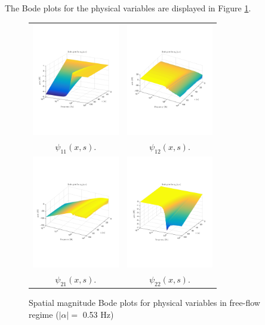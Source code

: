 \documentclass[a4paper, 10pt, conference]{ieeeconf}      %
\begin{document}
The Bode plots for the physical variables are displayed in Figure \ref{fig:Magn_spatial_physx}.

\begin{figure}
\centering
\begin{tabular}{cc}
\includegraphics[trim = 0mm 60mm 0mm 60mm, width = 3.8cm]{distr_psi_11}
&
\includegraphics[trim = 0mm 60mm 0mm 60mm, width = 3.8cm]{distr_psi_12}
\tabularnewline
$\psi_{11}(x,s)$.
&
$\psi_{12}(x,s)$.
\tabularnewline
\includegraphics[trim = 0mm 60mm 0mm 60mm, width = 3.8cm]{distr_psi_21}
&
\includegraphics[trim = 0mm 60mm 0mm 60mm, width = 3.8cm]{distr_psi_22}
\tabularnewline
$\psi_{21}(x,s)$.
&
$\psi_{22}(x,s)$.
\end{tabular}
\caption{Spatial magnitude Bode plots for physical variables in free-flow regime ($\left|\alpha\right| = $ 0.53 Hz)\label{fig:Magn_spatial_physx}}
\end{figure}
\end{document}
